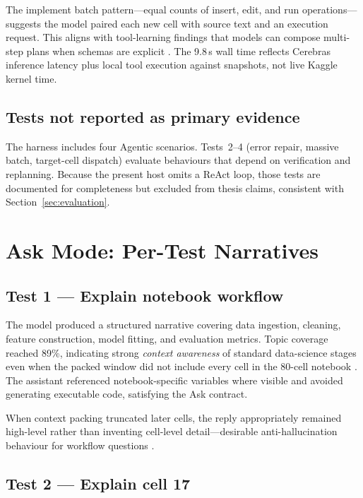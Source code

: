 The implement batch pattern---equal counts of insert, edit, and run operations---suggests the model paired each new cell with source text and an execution request. This aligns with tool-learning findings that models can compose multi-step plans when schemas are explicit \parencite{schick2023toolformer,qin2024toolllm}. The 9.8\,s wall time reflects Cerebras inference latency plus local tool execution against snapshots, not live Kaggle kernel time.

\subsection{Tests not reported as primary evidence}

The harness includes four Agentic scenarios. Tests~2--4 (error repair, massive batch, target-cell dispatch) evaluate behaviours that depend on verification and replanning. Because the present host omits a ReAct loop, those tests are documented for completeness but excluded from thesis claims, consistent with Section~\ref{sec:evaluation}.

\section{Ask Mode: Per-Test Narratives}
\label{sec:ask-detail}

\subsection{Test 1 --- Explain notebook workflow}

The model produced a structured narrative covering data ingestion, cleaning, feature construction, model fitting, and evaluation metrics. Topic coverage reached 89\%, indicating strong \emph{context awareness} of standard data-science stages even when the packed window did not include every cell in the 80-cell notebook \parencite{lewis2020rag}. The assistant referenced notebook-specific variables where visible and avoided generating executable code, satisfying the Ask contract.

When context packing truncated later cells, the reply appropriately remained high-level rather than inventing cell-level detail---desirable anti-hallucination behaviour for workflow questions \parencite{vaithilingam2022expectation}.

\subsection{Test 2 --- Explain cell 17}

